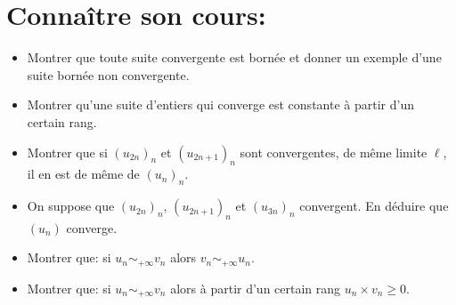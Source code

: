 \documentclass[a4paper,11pt]{article}
\theoremstyle{definition}
\begin{document}
 	
	

\noindent{}
\medskip





\section*{Connaître son cours:}
\begin{itemize}[$\bullet$]
	\item  Montrer que toute suite convergente est born\'ee et donner un exemple d'une suite bornée non convergente.
	\item  Montrer qu'une suite d'entiers qui converge est
	constante \`a partir d'un certain rang.
	\item Montrer que si $(u_{2n})_n$ et $(u_{2n+1})_n$ sont convergentes, de m\^{e}me
	limite $\ell$, il en est de m\^{e}me de $(u_{n})_n$.
	\item On suppose que $(u_{2n})_n$, $(u_{2n+1})_n$ et $(u_{3n})_n$ convergent. En déduire que $(u_{n})$ converge. 
	\item Montrer que: si $u_n \sim_{+\infty} v_n$ alors $v_n \sim_{+\infty} u_n$.
	\item Montrer que: si $u_n \sim_{+\infty} v_n$ alors à partir d'un certain rang $u_n\times v_n \geq 0$.  
\end{itemize}
\end{document}

